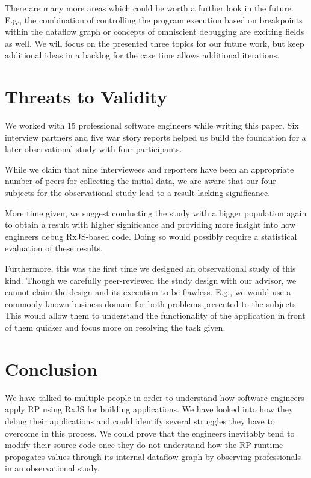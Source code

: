 \documentclass[12pt,a4paper]{article}
\begin{document}
There are many more areas which could be worth a further look in the future. E.g., the combination of controlling the program execution based on breakpoints within the dataflow graph or concepts of omniscient debugging are exciting fields as well. We will focus on the presented three topics for our future work, but keep additional ideas in a backlog for the case time allows additional iterations.

\section{Threats to Validity}
\label{sec:threats}

We worked with 15 professional software engineers while writing this paper. Six interview partners and five war story reports helped us build the foundation for a later observational study with four participants.

While we claim that nine interviewees and reporters have been an appropriate number of peers for collecting the initial data, we are aware that our four subjects for the observational study lead to a result lacking significance.

More time given, we suggest conducting the study with a bigger population again to obtain a result with higher significance and providing more insight into how engineers debug RxJS-based code. Doing so would possibly require a statistical evaluation of these results.

Furthermore, this was the first time we designed an observational study of this kind. Though we carefully peer-reviewed the study design with our advisor, we cannot claim the design and its execution to be flawless. E.g., we would use a commonly known business domain for both problems presented to the subjects. This would allow them to understand the functionality of the application in front of them quicker and focus more on resolving the task given.

\section{Conclusion}
\label{sec:conclusion}

We have talked to multiple people in order to understand how software engineers apply RP using RxJS for building applications. We have looked into how they debug their applications and could identify several struggles they have to overcome in this process. We could prove that the engineers inevitably tend to modify their source code once they do not understand how the RP runtime propagates values through its internal dataflow graph by observing professionals in an observational study.
\end{document}
